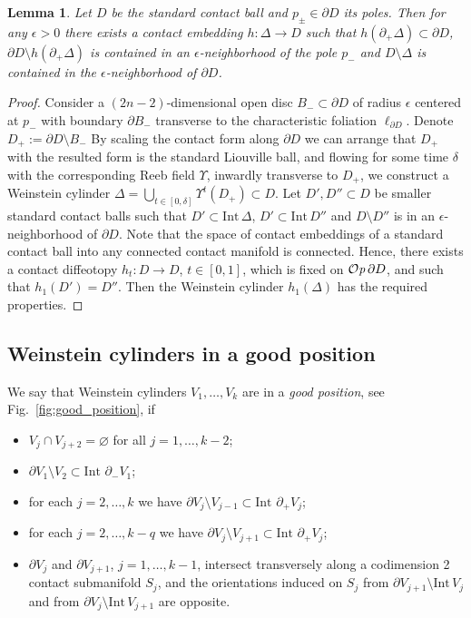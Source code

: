\documentclass[12pt]{amsart}
\theoremstyle{plain}
\newtheorem{lemma}[theorem]{Lemma}
\theoremstyle{definition}
\theoremstyle{remark}
\newcommand{\eps}{\epsilon}
\newcommand{\p}{\partial}
\newcommand{\Int}{\mathrm{Int\,}}
\newcommand{\Op}{ {\mathcal O}{\it p}\,}
\begin{document}
  

        \begin{lemma} \label{lm:approx-ball-by-cyl}
      Let $D$ be the standard contact ball and $p_\pm\in\p D$ its poles.
    Then for any $\eps>0$ there exists
  a contact embedding $h:\Delta\to D $ such that
    $h(\p_+\Delta)\subset \p D$, $\p D\setminus h(\p_+\Delta)$ is contained in   an $\eps$-neighborhood of  the pole $p_-$ and $D\setminus\Delta$ is contained in the $\eps$-neighborhood of $\p D$.
  \end{lemma}
  \begin{proof}
Consider a   $(2n-2)$-dimensional  open disc $B_-\subset\p D$ of radius $\eps$ centered at  $p_-$ with boundary $\p B_-$ transverse to the characteristic foliation $\ell_{\p D}$.  Denote $D_+:=\p D\setminus B_-$  By scaling the contact form along $\p D$   we can arrange that $D_+$ with the resulted form is the standard Liouville ball, and flowing for some time $\delta$ with the corresponding Reeb field $\Upsilon$, inwardly transverse to $D_+$, we  construct a  Weinstein cylinder $\Delta =\bigcup\limits_{t\in [0,\delta]}\Upsilon^t(D_+)\subset D$.  
  Let $D', D''\subset D$ be smaller standard  contact balls such that $D'\subset\Int  \Delta$, $D'\subset\Int D''$ and $D\setminus D''$ is in an $\eps$-neighborhood of $\p D$.
  Note that the space of contact embeddings of a standard contact ball into any connected contact manifold is connected. 
Hence, there exists a  contact diffeotopy $h_t:D\to D$, $t\in[0,1]$,  which is fixed on $\Op\p D$, and such that
$h_1(D')=D''$. Then the Weinstein cylinder  $h_1(\Delta)$
  has the required properties.
  \end{proof}

   
     \subsection{Weinstein cylinders in a good position}\label{sec:good-pos}





We say that Weinstein  cylinders $V_1,\dots, V_k$ are in a {\em good position}, see 
Fig.~\ref{fig:good_position}, if
  \begin{itemize}
  \item $V_j\cap V_{j+2}=\varnothing$ for  all $j=1,\dots, k-2$;
    \item $\p V_1\setminus V_2 \subset \Int\, \p_-V_1$;
  \item  for each $j=2,\dots, k$ we have $\p V_j\setminus  V_{j-1}\subset \Int\, \p_+V_j$;
\item  for each $j=2,\dots, k-q$ we have $\p V_j\setminus  V_{j+1}\subset \Int\, \p_+V_j$;
  \item $\p V_j$ and $\p V_{j+1}$,  $j=1,\dots,k-1$, intersect transversely along a codimension 2 contact submanifold  $S_j$, and the orientations  induced on $S_j$ from $\p V_{j+1}\setminus\Int V_j$ and from   $\p V_{j }\setminus\Int V_{j+1}$ are opposite.
  \end{itemize}
       
\end{document}
